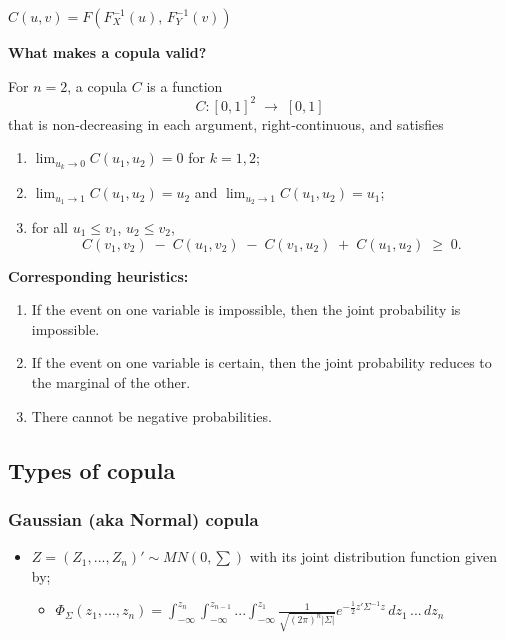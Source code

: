 \documentclass{article}
\begin{document}
$C(u,v) = F(F_X^{-1}(u), \, F_Y^{-1}(v))$

\vspace{.25cm}


\noindent \textbf{What makes a copula valid?}


For \(n=2\), a copula \(C\) is a function
\[
  C:[0,1]^2 \;\longrightarrow\;[0,1]
\]
that is non‑decreasing in each argument, right‑continuous, and satisfies
\begin{enumerate}[label=(\arabic*)]
  \item \(\displaystyle \lim_{u_k\to0}C(u_1,u_2)=0\) for \(k=1,2\);
  \item \(\displaystyle \lim_{u_1\to1}C(u_1,u_2)=u_2\) and
        \(\displaystyle \lim_{u_2\to1}C(u_1,u_2)=u_1\);
  \item for all \(u_1\le v_1\), \(u_2\le v_2\),
  \[
    C(v_1,v_2)\;-\;C(u_1,v_2)\;-\;C(v_1,u_2)\;+\;C(u_1,u_2)\;\ge\;0.
  \]
\end{enumerate}

\medskip
\noindent
\textbf{Corresponding heuristics:}
\begin{enumerate}[label=(\arabic*)]
  \item If the event on one variable is impossible, then the joint probability is impossible.
  \item If the event on one variable is certain, then the joint probability reduces to the marginal of the other.
  \item There cannot be negative probabilities.
\end{enumerate}





\subsection{Types of copula}

\subsubsection{Gaussian (aka Normal) copula}
\begin{itemize}
    \item $Z = (Z_1, ..., Z_n)' \sim MN(0, \sum)$ with its joint distribution function given by;
    \begin{itemize}
        \item $\Phi_\Sigma (z_1, ..., z_n) = \int_{-\infty}^{z_n} \int_{-\infty}^{z_{n-1}} ... \int_{-\infty}^{z_1}\frac{1}{\sqrt{(2\pi)^n |\Sigma|}}e^{-\frac{1}{2}z' \Sigma^{-1}z} \, dz_1 \, ... \, dz_n$
    \end{itemize}
\end{itemize}
\end{document}
